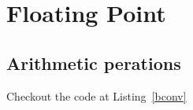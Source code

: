 \section{Floating Point}\label{sec:floating-point}



\subsection{Arithmetic perations}

Checkout the code at Listing~\ref{bconv}
